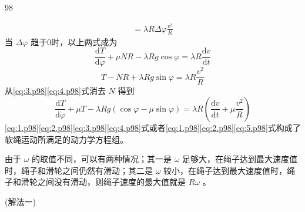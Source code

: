\begin{solution}{98}
\begin{subsolution}
\begin{align*}
            = \lambda R \Delta \varphi \frac {v ^ {2}}{R}
        \end{align*}
        当 $\Delta\varphi$ 趋于0时，以上两式成为
        \begin{equation}
            \frac {\mathrm{d} T}{\mathrm{d} \varphi} + \mu N R - \lambda R g \cos \varphi = \lambda R \frac {\mathrm{d} v}{\mathrm{d} t}
            \label{eq:3.p98}
        \end{equation}
        \begin{equation}
            T - N R + \lambda R g \sin \varphi = \lambda R \frac {v ^ {2}}{R}
            \label{eq:4.p98}
        \end{equation}
        从\eqref{eq:3.p98}\eqref{eq:4.p98}式消去 $N$ 得到
        \begin{equation}
            \frac {\mathrm{d} T}{\mathrm{d} \varphi} + \mu T - \lambda R g (\cos \varphi - \mu \sin \varphi) = \lambda R \left(\frac {\mathrm{d} v}{\mathrm{d} t} + \mu \frac {v ^ {2}}{R}\right)
            \label{eq:5.p98}
        \end{equation}
        \eqref{eq:1.p98}\eqref{eq:2.p98}\eqref{eq:3.p98}\eqref{eq:4.p98}式或者\eqref{eq:1.p98}\eqref{eq:2.p98}\eqref{eq:5.p98}式构成了软绳运动所满足的动力学方程组。
    \end{subsolution}
    \begin{subsolution}
        由于 $\omega$ 的取值不同，可以有两种情况；其一是 $\omega$ 足够大，在绳子达到最大速度值时，绳子和滑轮之间仍然有滑动；其二是 $\omega$ 较小，在绳子达到最大速度值时，绳子和滑轮之间没有滑动，则绳子速度的最大值就是 $R\omega$ 。

        (解法一)


\end{subsolution}
\end{solution}
